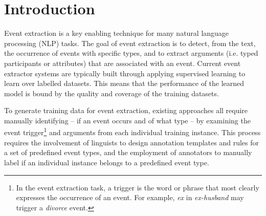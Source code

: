 \section{Introduction}
%

Event extraction is a key enabling technique for many natural language processing (NLP) tasks. The goal of event extraction is to detect,
from the text, the occurrence of events with specific types, and to extract arguments (i.e. typed participants or attributes) that are
associated with an event. Current event extractor systems are typically built through applying supervised learning to learn over labelled
datasets. This means that the performance of the learned model is bound by the quality and coverage of the training datasets.

To generate training data for event extraction, existing approaches all require manually identifying -- if an event occurs and of what type
-- by examining the event trigger\footnote{In the event extraction task, a trigger is the word or phrase that most clearly expresses the
occurrence of an event. For example, \textit{ex} in \textit{ex-husband} may trigger a \emph{divorce} event.} and arguments from each
individual training instance. This process requires the involvement of linguists to design annotation templates and rules for a set of
predefined event types, and the employment of annotators to manually label if an individual instance belongs to a predefined event type.


